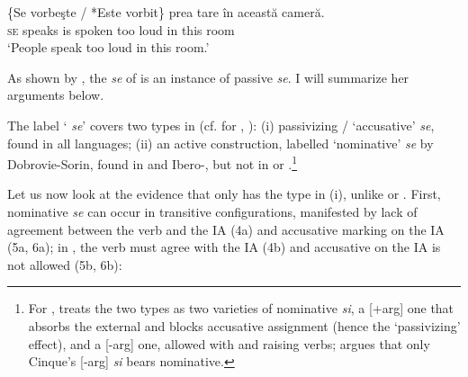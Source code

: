 \documentclass[output=paper]{langsci/langscibook}
\begin{document}
\ea%
    \label{ex:giurgea:3}
    \gll \{Se vorbeşte / *Este vorbit\} prea tare în această cameră.\\
         \textsc{se} speaks  {}     is      spoken too  loud in this       room\\
    \glt ‘People speak too loud in this room.’
    \z

As shown by \citet{Dobrovie-Sorin1998}, the  \textit{se} of  is an instance of passive \textit{se}. I will summarize her arguments below.

The label ‘ \textit{se}' covers two types in  (cf. \citealt{Belletti1982,Manzini1986,Burzio1986} for , \citealt{Dobrovie-Sorin1998,Dobrovie-Sorin2006,Dobrovie-Sorin2017}): (i) passivizing / ‘accusative' \textit{se}, found in all  languages; (ii) an active  construction, labelled ‘nominative' \textit{se} by Dobrovie-Sorin, found in  and Ibero-, but not in  or .\footnote{For , \citet{Cinque1988} treats the two types as two varieties of nominative \textit{si}, a [+arg] one that absorbs the external  and blocks accusative assignment (hence the ‘passivizing' effect), and a [-arg] one, allowed with  and  raising verbs; \citet{Dobrovie-Sorin1998} argues that only Cinque’s [-arg] \textit{si} bears nominative.} 

Let us now look at the evidence that  only has the type in (i), unlike  or . First, nominative \textit{se} can occur in transitive configurations, manifested by lack of agreement between the verb and the IA (4a) and accusative marking on the IA (5a, 6a); in , the verb must agree with the IA (4b) and accusative on the IA is not allowed (5b, 6b):

\ea%
    \label{ex:giurgea:4}
    \z
\z
\end{document}
